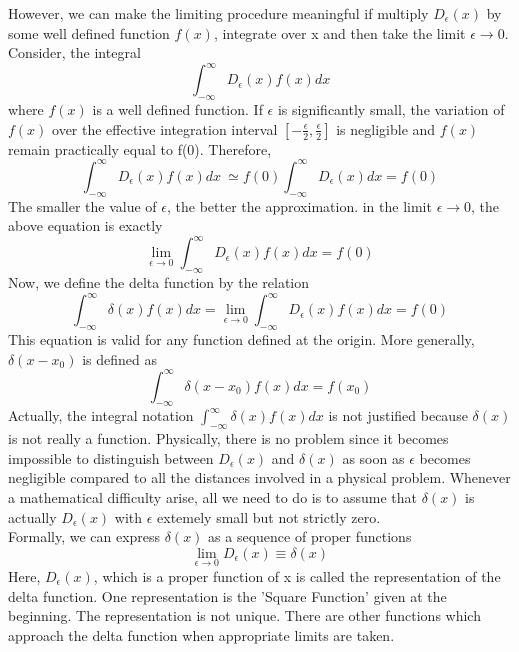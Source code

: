 However, we can make the limiting procedure meaningful if multiply $D_\epsilon (x)$ by some well defined function $f(x)$, integrate over x and then take the limit $\epsilon \to 0$. Consider, the integral $$\int_{-\infty}^\infty D_\epsilon (x) f(x) dx $$ where $f(x)$ is a well defined function. If $\epsilon$ is significantly small, the variation of $f(x)$ over the effective integration interval $[-\frac{\epsilon}{2},\frac{\epsilon}{2}]$ is negligible and $f(x)$ remain practically equal to f(0). Therefore,
\begin{equation}
\int_{-\infty}^{\infty} D_\epsilon (x) f(x) dx \ \simeq f(0) \int_{-\infty}^{\infty} D_\epsilon (x) dx = f(0)
\end{equation}
The smaller the value of $\epsilon$, the better the approximation. in the limit $\epsilon \to 0$, the above equation is exactly
\begin{equation}
\lim_{\epsilon \to 0} \int_{-\infty}^{\infty} D_\epsilon (x) f(x) dx = f(0)
\end{equation} 
Now, we define the delta function by the relation
\begin{equation}
\int_{-\infty}^\infty \delta (x) f(x) dx = \lim_{\epsilon \to 0} \int_{-\infty}^{\infty} D_\epsilon (x) f(x) dx = f(0)
\end{equation}
This equation is valid for any function defined at the origin. More generally, $\delta (x-x_0)$ is defined as
\begin{equation}
\int_{-\infty}^\infty \delta (x-x_0) f(x) dx = f(x_0)
\end{equation}
Actually, the integral notation $\int_{-\infty}^\infty \delta (x) f(x) dx $ is not justified because $\delta(x)$ is not really a function. Physically, there is no problem since it becomes impossible to distinguish between $D_\epsilon (x)$ and $\delta (x)$ as soon as $\epsilon$ becomes negligible compared to all the distances involved in a physical problem. Whenever a mathematical difficulty arise, all we need to do is to assume that $\delta (x)$ is actually $D_\epsilon (x)$ with $\epsilon$ extemely small but not strictly zero.\\

Formally, we can express $\delta(x)$ as a sequence of proper functions $$\lim_{\epsilon \to 0} D_\epsilon (x) \equiv \delta(x) $$ Here, $D_\epsilon (x)$, which is a proper function of x is called the representation of the delta function. One representation is the 'Square Function' given at the beginning. The representation is not unique. There are other functions which approach the delta function when appropriate limits are taken.

